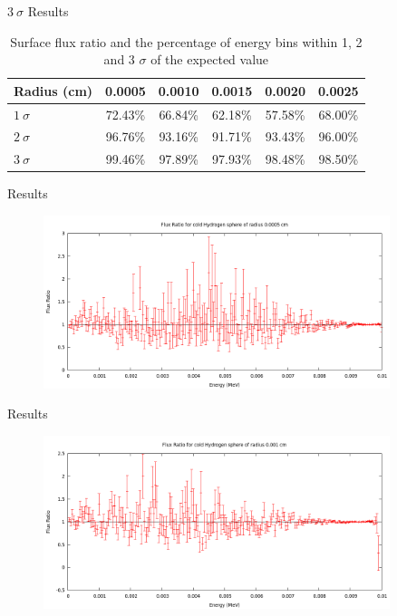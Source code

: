 \documentclass{beamer}
\begin{document}
\begin{frame}{$3~\sigma$ Results}

\begin{table}
\begin{tabular}{l | c | c | c | c | c}
Radius (cm) & 0.0005 & 0.0010 & 0.0015 & 0.0020 & 0.0025 \\
\hline \hline
$1 ~\sigma$ & 72.43\% & 66.84\% & 62.18\% & 57.58\% & 68.00\% \\ 
$2 ~\sigma$ & 96.76\% & 93.16\% & 91.71\% & 93.43\% & 96.00\% \\ 
$3 ~\sigma$ & 99.46\% & 97.89\% & 97.93\% & 98.48\% & 98.50\%
\end{tabular}
\caption{\centering Surface flux ratio and the percentage of energy bins within 1, 2 and 3 $\sigma$ of the expected value}
\end{table}
    
\end{frame}

\begin{frame}{Results}

  \begin{figure}
     \centering
     \includegraphics[width = 0.9\textwidth]{./Sphere1.png}
  \end{figure}


\end{frame}

\begin{frame}{Results}

  \begin{figure}
     \centering
     \includegraphics[width = 0.9\textwidth]{./Sphere2.png}
  \end{figure}


\end{frame}
\end{document}

